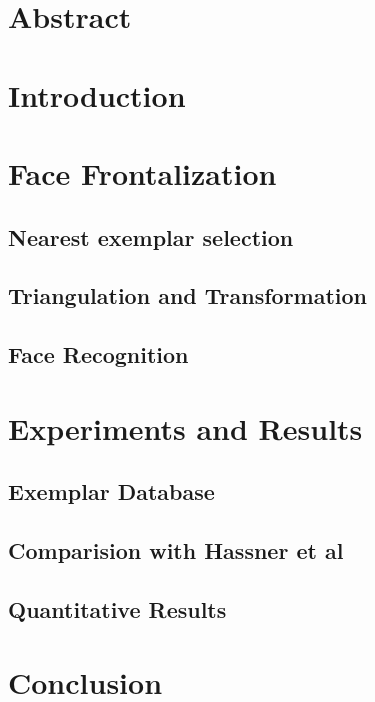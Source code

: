 \section{Abstract}


\section{Introduction}


% 

\section{Face Frontalization}


\subsection{Nearest exemplar selection}


\subsection{Triangulation and Transformation}


\subsection{Face Recognition}


\section{Experiments and Results}


\subsection{Exemplar Database}


\subsection{Comparision with Hassner et al}


\subsection{Quantitative Results}


\section{Conclusion}

